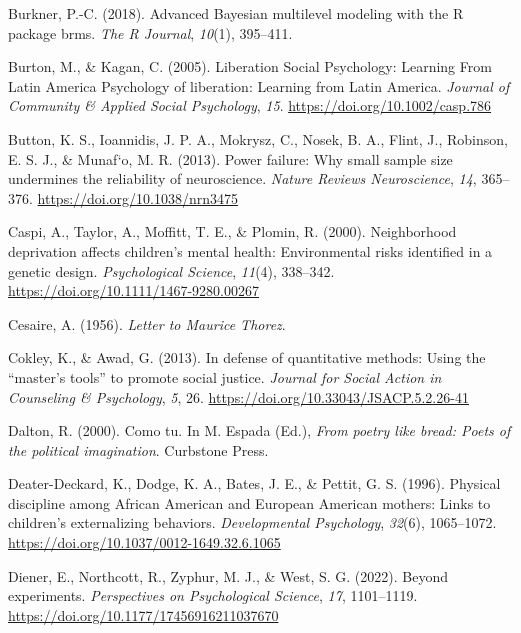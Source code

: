 \documentclass[
  letterpaper,
  DIV=11,
  numbers=noendperiod]{scrreprt}
\newlength{\cslhangindent}
\newlength{\cslentryspacingunit} %
\newenvironment{CSLReferences}[2] %
 {%
  \setlength{\parindent}{0pt}
  \ifodd #1
  \let\oldpar\par
  \def\par{\hangindent=\cslhangindent\oldpar}
  \fi
  \setlength{\parskip}{#2\cslentryspacingunit}
 }%
 {}
\begin{document}
\begin{CSLReferences}{1}{0}
\leavevmode{}%
Burkner, P.-C. (2018). Advanced {B}ayesian multilevel modeling with the
{R} package brms. \emph{The R Journal}, \emph{10}(1), 395--411.

\leavevmode{}%
Burton, M., \& Kagan, C. (2005). {Liberation Social Psychology: Learning
From Latin America Psychology of liberation: Learning from Latin
America}. \emph{Journal of Community \& Applied Social Psychology},
\emph{15}. \url{https://doi.org/10.1002/casp.786}

\leavevmode{}%
Button, K. S., Ioannidis, J. P. A., Mokrysz, C., Nosek, B. A., Flint,
J., Robinson, E. S. J., \& Munaf`o, M. R. (2013). Power failure: Why
small sample size undermines the reliability of neuroscience.
\emph{Nature Reviews Neuroscience}, \emph{14}, 365--376.
\url{https://doi.org/10.1038/nrn3475}

\leavevmode{}%
Caspi, A., Taylor, A., Moffitt, T. E., \& Plomin, R. (2000).
Neighborhood deprivation affects children's mental health: Environmental
risks identified in a genetic design. \emph{Psychological Science},
\emph{11}(4), 338--342. \url{https://doi.org/10.1111/1467-9280.00267}

\leavevmode{}%
Cesaire, A. (1956). \emph{Letter to {M}aurice {T}horez}.

\leavevmode{}%
Cokley, K., \& Awad, G. (2013). In defense of quantitative methods:
Using the {``master's tools''} to promote social justice. \emph{Journal
for Social Action in Counseling \& Psychology}, \emph{5}, 26.
\url{https://doi.org/10.33043/JSACP.5.2.26-41}

\leavevmode{}%
Dalton, R. (2000). Como tu. In M. Espada (Ed.), \emph{From poetry like
bread: Poets of the political imagination}. Curbstone Press.

\leavevmode{}%
Deater-Deckard, K., Dodge, K. A., Bates, J. E., \& Pettit, G. S. (1996).
{Physical discipline among African American and European American
mothers: Links to children's externalizing behaviors.}
\emph{Developmental Psychology}, \emph{32}(6), 1065--1072.
\url{https://doi.org/10.1037/0012-1649.32.6.1065}

\leavevmode{}%
Diener, E., Northcott, R., Zyphur, M. J., \& West, S. G. (2022). Beyond
experiments. \emph{Perspectives on Psychological Science}, \emph{17},
1101--1119. \url{https://doi.org/10.1177/17456916211037670}


\end{CSLReferences}
\end{document}
